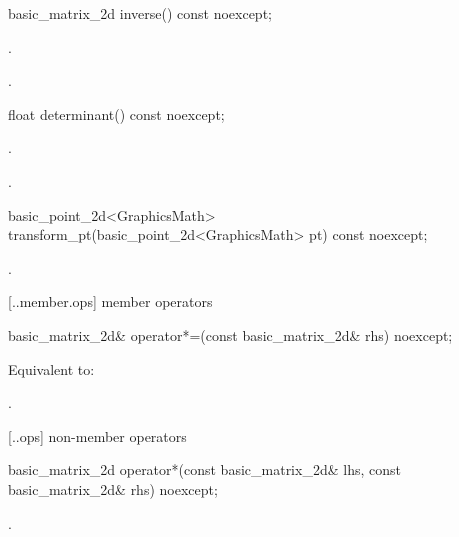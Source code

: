 %
\begin{itemdecl}
basic_matrix_2d inverse() const noexcept;
\end{itemdecl}
\begin{itemdescr}
\pnum
\requires
{}.

\pnum
\returns
{}.
\end{itemdescr}

%
\begin{itemdecl}
float determinant() const noexcept;
\end{itemdecl}
\begin{itemdescr}
\pnum
\requires
{}.

\pnum
\returns
{}.
\end{itemdescr}

%
\begin{itemdecl}
basic_point_2d<GraphicsMath> transform_pt(basic_point_2d<GraphicsMath> pt) const noexcept;
\end{itemdecl}
\begin{itemdescr}
\pnum
\returns
{}.
\end{itemdescr}

 [\iotwod.\matrixtwod.member.ops] { member operators}

%
\begin{itemdecl}
basic_matrix_2d& operator*=(const basic_matrix_2d& rhs) noexcept;
\end{itemdecl}
\begin{itemdescr}
\pnum
\effects
Equivalent to: 

\pnum
\returns
{}.
\end{itemdescr}

 [\iotwod.\matrixtwod.ops] { non-member operators}

%
\begin{itemdecl}
basic_matrix_2d operator*(const basic_matrix_2d& lhs, const basic_matrix_2d& rhs)
  noexcept;
\end{itemdecl}
\begin{itemdescr}
\pnum
\returns
{}.
\end{itemdescr}

